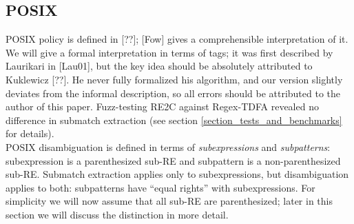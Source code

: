 \documentclass{article}
\theoremstyle{definition}
\begin{document}
\begin{multicols}{2}
\subsection*{POSIX}

POSIX policy is defined in [??]; [Fow] gives a comprehensible interpretation of it.
We will give a formal interpretation in terms of tags;
it was first described by Laurikari in [Lau01], but the key idea should be absolutely attributed to Kuklewicz [??].
He never fully formalized his algorithm, and our version slightly deviates from the informal description,
so all errors should be attributed to the author of this paper.
Fuzz-testing RE2C against Regex-TDFA revealed no difference in submatch extraction
(see section \ref{section_tests_and_benchmarks} for details).
\\

POSIX disambiguation is defined in terms of \emph{subexpressions} and \emph{subpatterns}:
subexpression is a parenthesized sub-RE and subpattern is a non-parenthesized sub-RE.
Submatch extraction applies only to subexpressions, but disambiguation applies to both:
subpatterns have ``equal rights'' with subexpressions.
For simplicity we will now assume that all sub-RE are parenthesized;
later in this section we will discuss the distinction in more detail.
\\


\end{multicols}
\end{document}
